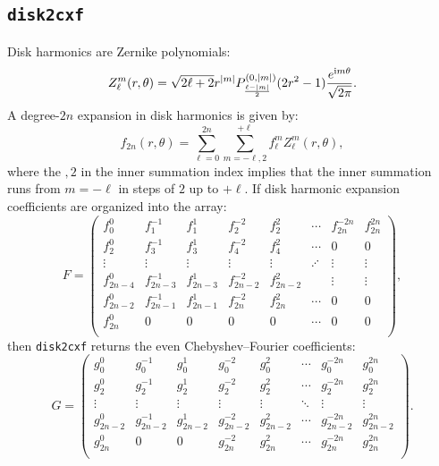 \documentclass{article}
\def\ii{{\rm i}}
\def\abs#1{\left|{#1}\right|}
\begin{document}
\subsection{{\tt disk2cxf}}

Disk harmonics are Zernike polynomials:
\begin{equation}
Z_\ell^m(r,\theta) = \sqrt{2\ell+2} r^{\abs{m}}P_{\frac{\ell-\abs{m}}{2}}^{(0,\abs{m})}(2r^2-1)\frac{e^{\ii m\theta}}{\sqrt{2\pi}}.
\end{equation}
A degree-$2n$ expansion in disk harmonics is given by:
\begin{equation}
f_{2n}(r,\theta) = \sum_{\ell=0}^{2n}\sum_{m=-\ell,2}^{+\ell} f_\ell^m Z_\ell^m(r,\theta),
\end{equation}
where the $,2$ in the inner summation index implies that the inner summation runs from $m=-\ell$ in steps of $2$ up to $+\ell$. If disk harmonic expansion coefficients are organized into the array:
\begin{equation}
F = \begin{pmatrix}
f_0^0 & f_1^{-1} & f_1^1 & f_2^{-2} & f_2^2 & \cdots & f_{2n}^{-2n} & f_{2n}^{2n}\\
f_2^0 & f_3^{-1} & f_3^1 & f_4^{-2} & f_4^2 & \cdots & 0 & 0\\
\vdots & \vdots & \vdots &  \vdots &  \vdots & \iddots & \vdots & \vdots\\
f_{2n-4}^0 & f_{2n-3}^{-1} & f_{2n-3}^1 & f_{2n-2}^{-2} & f_{2n-2}^2 &  & \vdots & \vdots\\
f_{2n-2}^0 & f_{2n-1}^{-1} & f_{2n-1}^1 & f_{2n}^{-2} & f_{2n}^2 & \cdots & 0 & 0\\
f_{2n}^0 & 0 & 0 & 0 & 0 & \cdots & 0 & 0\\
\end{pmatrix},
\end{equation}
then {\tt disk2cxf} returns the even Chebyshev--Fourier coefficients:
\begin{equation}
G = \begin{pmatrix}
g_0^0 & g_0^{-1} & g_0^1 & g_0^{-2} & g_0^2 & \cdots & g_0^{-2n} & g_0^{2n}\\
g_2^0 & g_2^{-1} & g_2^1 & g_2^{-2} & g_2^2 & \cdots & g_2^{-2n} & g_2^{2n}\\
\vdots & \vdots & \vdots & \vdots & \vdots & \ddots & \vdots & \vdots\\
g_{2n-2}^0 & g_{2n-2}^{-1} & g_{2n-2}^1 & g_{2n-2}^{-2} & g_{2n-2}^2 & \cdots & g_{2n-2}^{-2n} & g_{2n-2}^{2n}\\
g_{2n}^0 & 0 & 0 & g_{2n}^{-2} & g_{2n}^2 & \cdots & g_{2n}^{-2n} & g_{2n}^{2n}\\
\end{pmatrix}.
\end{equation}
\end{document}
